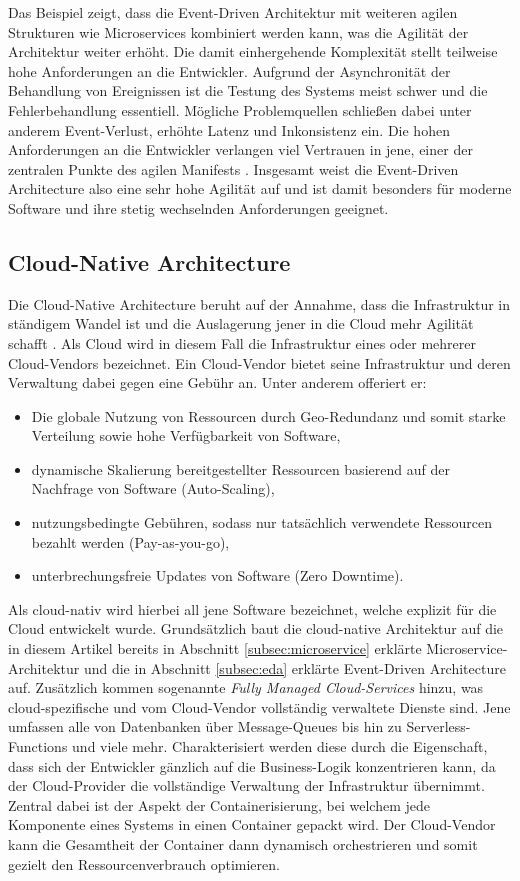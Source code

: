 \documentclass[acmtog]{acmart}
\begin{document}
Das Beispiel zeigt, dass die Event-Driven Architektur mit weiteren agilen Strukturen wie Microservices kombiniert werden kann, was die Agilität der Architektur weiter erhöht.
Die damit einhergehende Komplexität stellt teilweise hohe Anforderungen an die Entwickler.
Aufgrund der Asynchronität der Behandlung von Ereignissen ist die Testung des Systems meist schwer und die Fehlerbehandlung essentiell.
Mögliche Problemquellen schließen dabei unter anderem Event-Verlust, erhöhte Latenz und Inkonsistenz ein.
Die hohen Anforderungen an die Entwickler verlangen viel Vertrauen in jene, einer der zentralen Punkte des agilen Manifests \cite{agileManifesto}.
Insgesamt weist die Event-Driven Architecture also eine sehr hohe Agilität auf und ist damit besonders für moderne Software und ihre stetig wechselnden Anforderungen geeignet.

\subsection{Cloud-Native Architecture}
Die Cloud-Native Architecture beruht auf der Annahme, dass die Infrastruktur in ständigem Wandel ist und die Auslagerung jener in die Cloud mehr Agilität schafft \cite{cloudNative}.
Als Cloud wird in diesem Fall die Infrastruktur eines oder mehrerer Cloud-Vendors bezeichnet.
Ein Cloud-Vendor bietet seine Infrastruktur und deren Verwaltung dabei gegen eine Gebühr an.
Unter anderem offeriert er:
\begin{itemize}
  \item Die globale Nutzung von Ressourcen durch Geo-Redundanz und somit starke Verteilung sowie hohe Verfügbarkeit von Software,
  \item dynamische Skalierung bereitgestellter Ressourcen basierend auf der Nachfrage von Software (Auto-Scaling),
  \item nutzungsbedingte Gebühren, sodass nur tatsächlich verwendete Ressourcen bezahlt werden (Pay-as-you-go),
  \item unterbrechungsfreie Updates von Software (Zero Downtime).
\end{itemize}

Als cloud-nativ wird hierbei all jene Software bezeichnet, welche explizit für die Cloud entwickelt wurde.
Grundsätzlich baut die cloud-native Architektur auf die in diesem Artikel bereits in Abschnitt \ref{subsec:microservice} erklärte Microservice-Architektur und die
in Abschnitt \ref{subsec:eda} erklärte Event-Driven Architecture auf.
Zusätzlich kommen sogenannte \textit{Fully Managed Cloud-Services} hinzu, was cloud-spezifische und vom Cloud-Vendor vollständig verwaltete Dienste sind.
Jene umfassen alle von Datenbanken über Message-Queues bis hin zu Serverless-Functions und viele mehr.
Charakterisiert werden diese durch die Eigenschaft, dass sich der Entwickler gänzlich auf die Business-Logik konzentrieren kann, da der Cloud-Provider
die vollständige Verwaltung der Infrastruktur übernimmt.
Zentral dabei ist der Aspekt der Containerisierung, bei welchem jede Komponente eines Systems in einen Container gepackt wird.
Der Cloud-Vendor kann die Gesamtheit der Container dann dynamisch orchestrieren und somit gezielt den Ressourcenverbrauch optimieren.
\end{document}
